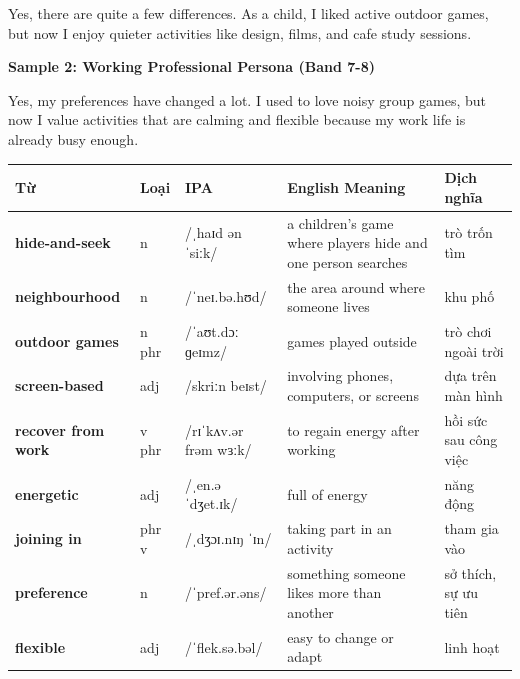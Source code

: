 Yes, there are quite a few differences. As a child, I liked active outdoor games, but now I enjoy quieter activities like design, films, and cafe study sessions.

\textbf{Sample 2: Working Professional Persona (Band 7-8)}

Yes, my preferences have changed a lot. I used to love noisy group games, but now I value activities that are calming and flexible because my work life is already busy enough.

\separator


\vspace{0.8em}
\begin{center}
\renewcommand{\arraystretch}{1.65}
\begin{tabularx}{\textwidth}{|V{0.22\textwidth}|C{0.07\textwidth}|I{0.20\textwidth}|Y|V{0.18\textwidth}|}
\hline
{}
\textbf{Từ} & \textbf{Loại} & \textbf{IPA} & \textbf{English Meaning} & \textbf{Dịch nghĩa} \\
\hline
\textbf{hide-and-seek} & n & /ˌhaɪd ən ˈsiːk/ & a children's game where players hide and one person searches & trò trốn tìm \\ \hline
\textbf{neighbourhood} & n & /ˈneɪ.bə.hʊd/ & the area around where someone lives & khu phố \\ \hline
\textbf{outdoor games} & n phr & /ˈaʊt.dɔː ɡeɪmz/ & games played outside & trò chơi ngoài trời \\ \hline
\textbf{screen-based} & adj & /skriːn beɪst/ & involving phones, computers, or screens & dựa trên màn hình \\ \hline
\textbf{recover from work} & v phr & /rɪˈkʌv.ər frəm wɜːk/ & to regain energy after working & hồi sức sau công việc \\ \hline
\textbf{energetic} & adj & /ˌen.əˈdʒet.ɪk/ & full of energy & năng động \\ \hline
\textbf{joining in} & phr v & /ˌdʒɔɪ.nɪŋ ˈɪn/ & taking part in an activity & tham gia vào \\ \hline
\textbf{preference} & n & /ˈpref.ər.əns/ & something someone likes more than another & sở thích, sự ưu tiên \\ \hline
\textbf{flexible} & adj & /ˈflek.sə.bəl/ & easy to change or adapt & linh hoạt \\ \hline
\end{tabularx}
\end{center}

\newpage

